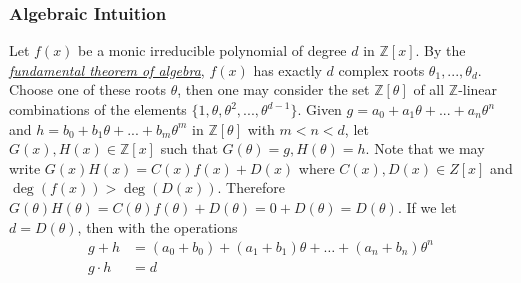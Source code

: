 \documentclass[10pt,a4paper]{article}
\theoremstyle{plain}
\theoremstyle{definition}
\theoremstyle{remark}
\newcommand{\Z}{\mathbb{Z}}
\begin{document}
  \subsubsection{Algebraic Intuition}
    Let $f(x)$ be a monic irreducible polynomial of degree $d$ in $\mathbb{Z}[x]$. By the \hyperref[fun]{\textit{fundamental theorem of algebra}}, $f(x)$ has exactly $d$ complex roots $\theta_1, ... , \theta_d$. Choose one of these roots $\theta$, then one may consider the set $\Z[\theta]$ of all $\Z$-linear combinations of the elements $\lbrace 1,\theta,\theta^2,...,\theta^{d-1} \rbrace $. Given $g =  a_0 + a_1\theta + ... + a_n\theta^n $ and $ h= b_0 + b_1 \theta + ... + b_m \theta^m $ in $ \Z[\theta]$ with $m < n < d$, let $G(x),H(x) \in \mathbb{Z}[x] $ such that $G(\theta) = g, H(\theta) = h $. Note that we may write $G(x)H(x) = C(x)f(x) + D(x)$ where $C(x), D(x) \in Z[x]$ and $\deg(f(x)) >  \deg (D(x))$. Therefore $ G(\theta) H(\theta) = C(\theta)f(\theta) + D(\theta) = 0 + D(\theta) = D(\theta) $. If we let $d = D(\theta)$, then with the operations  
    \begin{align*}
    g+ h &=  (a_0 + b_0) + (a_1 + b_1) \theta + \dots + (a_n + b_n )\theta^n \\
    g \cdot  h &= d
    \end{align*}
\end{document}
